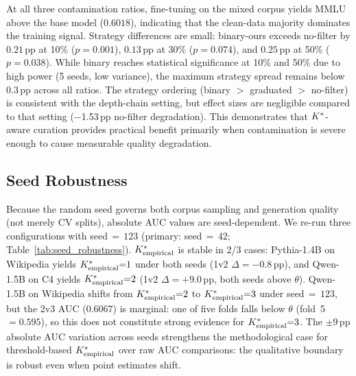 \begin{table}[h]
\centering
\small
\caption{MMLU accuracy by contamination ratio (fraction of synthetic data in training set) and filtering strategy. Base model (no fine-tuning): 0.6018. Mean $\pm$ std over 5 seeds.}
\label{tab:dose_response}
\end{table}

{\sloppy At all three contamination ratios, fine-tuning on the mixed corpus yields MMLU above the base model ($0.6018$), indicating that the clean-data majority dominates the training signal.
Strategy differences are small: binary-ours exceeds no-filter by $0.21$\,pp at 10\% ($p = 0.001$), $0.13$\,pp at 30\% ($p = 0.074$), and $0.25$\,pp at 50\% ($p = 0.038$).
While binary reaches statistical significance at 10\% and 50\% due to high power (5 seeds, low variance), the maximum strategy spread remains below 0.3\,pp across all ratios.
The strategy ordering (binary $>$ graduated $>$ no-filter) is consistent with the depth-chain setting, but effect sizes are negligible compared to that setting ($-$1.53\,pp no-filter degradation).
This demonstrates that ${K^*}$-aware curation provides practical benefit primarily when contamination is severe enough to cause measurable quality degradation.\par}

\subsection{Seed Robustness}
\label{sec:seed_robustness}

Because the random seed governs both corpus sampling and generation quality (not merely CV splits), absolute AUC values are seed-dependent.
We re-run three configurations with seed$\,{=}\,123$ (primary: seed$\,{=}\,42$; Table~\ref{tab:seed_robustness}).
${K^*_{\text{empirical}}}$ is stable in 2/3 cases: Pythia-1.4B on Wikipedia yields ${K^*_{\text{empirical}}}{=}1$ under both seeds (1v2 $\Delta = -0.8$\,pp), and Qwen-1.5B on C4 yields ${K^*_{\text{empirical}}}{=}2$ (1v2 $\Delta = +9.0$\,pp, both seeds above $\theta$).
Qwen-1.5B on Wikipedia shifts from ${K^*_{\text{empirical}}}{=}2$ to ${K^*_{\text{empirical}}}{=}3$ under seed$\,{=}\,123$, but the 2v3 AUC ($0.6067$) is marginal: one of five folds falls below $\theta$ (fold~5 $= 0.595$), so this does not constitute strong evidence for ${K^*_{\text{empirical}}}{=}3$.
The ${\pm}9$\,pp absolute AUC variation across seeds strengthens the methodological case for threshold-based ${K^*_{\text{empirical}}}$ over raw AUC comparisons: the qualitative boundary is robust even when point estimates shift.

